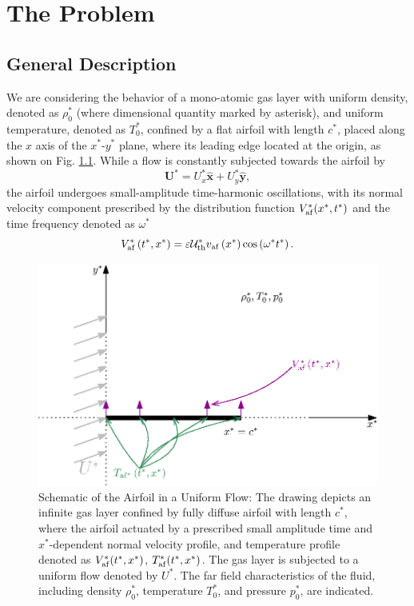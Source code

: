 \chapter{The Problem}
\section{General Description}
We are considering the behavior of a mono-atomic gas layer with uniform density, denoted as $\rho_0^*$ (where dimensional quantity marked by asterisk), and uniform temperature, denoted as $T_0^*$, confined by a flat airfoil with length $c^*$, placed along the $x$ axis of the $x^*$-$y^*$ plane, where its leading edge located at the origin, as shown on Fig. \ref{fig:problem_description}. While a flow is constantly subjected towards the airfoil by
\begin{equation}
    \mathbf{U^*}=U_x^*\hat{\mathbf{x}} + U_y^*\hat{\mathbf{y}}
    ,
\end{equation}
the airfoil undergoes small-amplitude time-harmonic oscillations, with its normal velocity component prescribed by the distribution function $V_{\mathrm{af}}^*(x^*,t^*)$ and the time frequency denoted as $\omega^*$
\begin{equation} \label{eq:V_af}
    V_{\mathrm{af}}^*\left(t^*,x^*\right)
    =
    \varepsilon \mathcal{U}_{\mathrm{th}}^* v_{\mathrm{af}}\left(x^*\right)
    \cos\left(\omega^* t^*\right)
    .
\end{equation}
\begin{figure}[ht]
    \centering
    \includegraphics{drawings/problem_description.eps}
    \caption{\footnotesize Schematic of the Airfoil in a Uniform Flow: The drawing depicts an infinite gas layer confined by fully diffuse airfoil with length $c^*$, where the airfoil actuated by a prescribed small amplitude time and $x^*$-dependent normal velocity profile, and temperature profile denoted as $V_{\mathrm{af}}^*(t^*,x^*)$, $T_{\mathrm{af}}^*(t^*,x^*)$. The gas layer is subjected to a uniform flow denoted by $U^*$. The far field characteristics of the fluid, including density $\rho_0^*$, temperature $T_0^*$, and pressure $p_0^*$, are indicated.}
    \label{fig:problem_description}
\end{figure}
